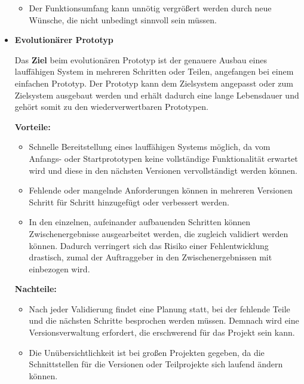 \documentclass{swp1}
\begin{document}
\begin{itemize}
\begin{itemize}
\item Der Funktionsumfang kann unnötig vergrößert werden durch neue Wünsche, die nicht unbedingt sinnvoll sein müssen.
\end{itemize}

\item \textbf{Evolutionärer Prototyp}

Das \textbf{Ziel} beim evolutionären Prototyp ist der genauere Ausbau eines lauffähigen System in mehreren Schritten oder Teilen, angefangen bei einem einfachen Prototyp. Der Prototyp kann dem Zielsystem angepasst oder zum Zielsystem ausgebaut werden und erhält dadurch eine lange Lebensdauer und gehört somit zu den wiederverwertbaren Prototypen.


\textbf{Vorteile:}

\begin{itemize}
\item Schnelle Bereitstellung eines lauffähigen Systems möglich, da vom Anfangs- oder Startprototypen keine vollständige Funktionalität erwartet wird und diese in den nächsten Versionen vervollständigt werden können.
\end{itemize}

\begin{itemize}
\item Fehlende oder mangelnde Anforderungen können in mehreren Versionen Schritt für Schritt hinzugefügt oder verbessert werden.
\end{itemize}


\begin{itemize}
\item In den einzelnen, aufeinander aufbauenden Schritten können Zwischenergebnisse ausgearbeitet werden, die zugleich validiert werden können. Dadurch verringert sich das Risiko einer Fehlentwicklung drastisch, zumal der Auftraggeber in den Zwischenergebnissen mit einbezogen wird.
\end{itemize}

\textbf{Nachteile:}
\begin{itemize}
\item Nach jeder Validierung findet eine Planung statt, bei der fehlende Teile und die nächsten Schritte besprochen werden müssen. Demnach wird eine Versionsverwaltung erfordert, die erschwerend für das Projekt sein kann.
\end{itemize}

\begin{itemize}
\item Die Unübersichtlichkeit ist bei großen Projekten gegeben, da die Schnittstellen für die Versionen oder Teilprojekte sich laufend ändern können.
\end{itemize}


\end{itemize}
\end{document}
